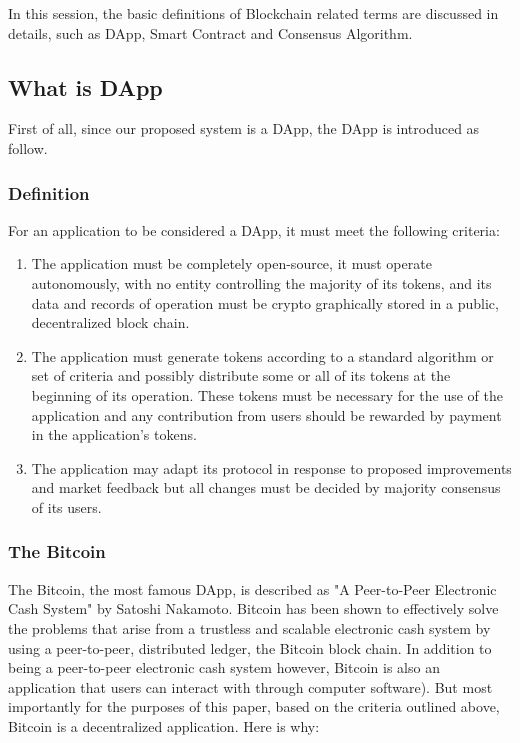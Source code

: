 In this session, the basic definitions of Blockchain related terms are discussed in details, such as DApp, Smart Contract and Consensus Algorithm.

\subsection{What is DApp}

First of all, since our proposed system is a DApp\cite{johnston_general_nodate}, the DApp is introduced as follow. 

\subsubsection{Definition}

For an application to be considered a DApp, it must meet the following criteria:

\begin{enumerate}
\item The application must be completely open-source, it must operate autonomously, with no entity controlling the majority of its tokens, and its data and records of operation must be crypto graphically stored in a public, decentralized block chain.
\item The application must generate tokens according to a standard algorithm or set of criteria and possibly distribute some or all of its tokens at the beginning of its operation. These tokens must be necessary for the use of the application and any contribution from users should be rewarded by payment in the application’s tokens.
\item The application may adapt its protocol in response to proposed improvements and market feedback but all changes must be decided by majority consensus of its users.
\end{enumerate}

\subsubsection{The Bitcoin}

The Bitcoin, the most famous DApp, is described as "A Peer-to-Peer Electronic Cash System\cite{nakamoto_bitcoin_nodate}" by Satoshi Nakamoto. Bitcoin has been shown to effectively solve the problems that arise from a trustless and scalable electronic cash system by using a peer-to-peer, distributed ledger, the Bitcoin block chain. In addition to being a peer-to-peer electronic cash system however, Bitcoin is also an application that users can interact with through computer software). But most importantly for the purposes of this paper, based on the criteria outlined above, Bitcoin is a decentralized application. Here is why:

